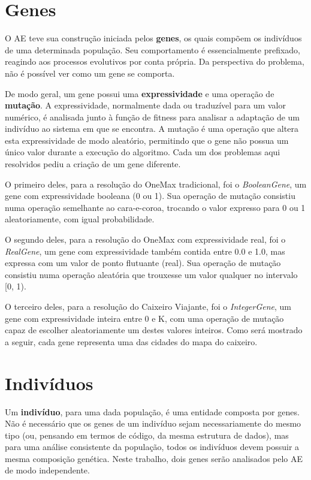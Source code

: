 \label{3_populacao}

\section{Genes}

O AE teve sua construção iniciada pelos \textbf{genes}, os quais compõem os indivíduos de uma determinada população. Seu comportamento é essencialmente prefixado, reagindo aos processos evolutivos por conta própria. Da perspectiva do problema, não é possível ver como um gene se comporta.

De modo geral, um gene possui uma \textbf{expressividade} e uma operação de \textbf{mutação}. A expressividade, normalmente dada ou traduzível para um valor numérico, é analisada junto à função de fitness para analisar a adaptação de um indivíduo ao sistema em que se encontra. A mutação é uma operação que altera esta expressividade de modo aleatório, permitindo que o gene não possua um único valor durante a execução do algoritmo. Cada um dos problemas aqui resolvidos pediu a criação de um gene diferente.

O primeiro deles, para a resolução do OneMax tradicional, foi o \textit{BooleanGene}, um gene com expressividade booleana (0 ou 1). Sua operação de mutação consistiu numa operação semelhante ao cara-e-coroa, trocando o valor expresso para 0 ou 1 aleatoriamente, com igual probabilidade.

O segundo deles, para a resolução do OneMax com expressividade real, foi o \textit{RealGene}, um gene com expressividade também contida entre 0.0 e 1.0, mas expressa com um valor de ponto flutuante (real). Sua operação de mutação consistiu numa operação aleatória que trouxesse um valor qualquer no intervalo [0, 1).

O terceiro deles, para a resolução do Caixeiro Viajante, foi o \textit{IntegerGene}, um gene com expressividade inteira entre 0 e K, com uma operação de mutação capaz de escolher aleatoriamente um destes valores inteiros. Como será mostrado a seguir, cada gene representa uma das cidades do mapa do caixeiro.

\section{Indivíduos}

Um \textbf{indivíduo}, para uma dada população, é uma entidade composta por genes. Não é necessário que os genes de um indivíduo sejam necessariamente do mesmo tipo (ou, pensando em termos de código, da mesma estrutura de dados), mas para uma análise consistente da população, todos os indivíduos devem possuir a mesma composição genética. Neste trabalho, dois genes serão analisados pelo AE de modo independente.

